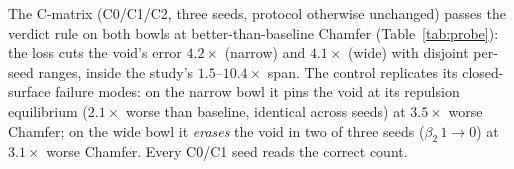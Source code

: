 The C-matrix (C0/C1/C2, three seeds, protocol otherwise unchanged)
passes the verdict rule on both bowls at better-than-baseline Chamfer
(Table~\ref{tab:probe}): the loss cuts the void's error $4.2\times$
(narrow) and $4.1\times$ (wide) with disjoint per-seed ranges, inside
the study's $1.5$--$10.4\times$ span. The control replicates its
closed-surface failure modes: on the narrow bowl it pins the void at
its repulsion equilibrium ($2.1\times$ worse than baseline, identical
across seeds) at $3.5\times$ worse Chamfer; on the wide bowl it
\emph{erases} the void in two of three seeds ($\beta_2\,1{\to}0$) at
$3.1\times$ worse Chamfer. Every C0/C1 seed reads the correct count.

\begin{table}[t]
\centering
\caption{Open-surface probe C-matrix: tail bottleneck (mean$\pm$sd, 3
seeds; per-seed values in run order beneath); $\times$ = reduction vs
C0. Both shapes \textbf{pass} the verdict rule; no Welch $\sigma$ at
$n{=}3$ (main \S4).}
\label{tab:probe}
\scriptsize
\setlength{\tabcolsep}{2pt}
\end{table}

